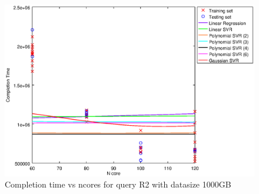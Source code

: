
\begin {figure}[hbtp]
\centering
\includegraphics[width=\textwidth]{output/R2_1000_LINEAR_NCORE/plot_R2_1000.eps}
\caption{Completion time vs ncores for query R2 with datasize 1000GB}
\label{fig:coreonly_linear_R2_1000}
\end {figure}
